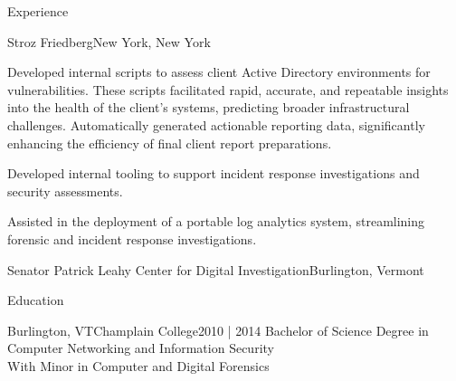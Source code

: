 \documentclass[]{mcdowellcv}
\begin{document}
\begin{cvsection}{Experience}
\begin{jobentry}{Stroz Friedberg}{New York, New York}
        \begin{jobprojects}
            \item Developed internal scripts to assess client Active Directory environments for vulnerabilities. These scripts facilitated rapid, accurate, and repeatable insights into the health of the client's systems, predicting broader infrastructural challenges. Automatically generated actionable reporting data, significantly enhancing the efficiency of final client report preparations.
            \item Developed internal tooling to support incident response investigations and security assessments.
            \item Assisted in the deployment of a portable log analytics system, streamlining forensic and incident response investigations.
        \end{jobprojects}
    \end{jobentry}


    \begin{jobentry}{Senator Patrick Leahy Center for Digital Investigation}{Burlington, Vermont}
        \begin{jobpositions}
        \end{jobpositions}
        
        
    \end{jobentry}

\end{cvsection}

\begin{cvsection}{Education}
    \begin{cvsubsection}{Burlington, VT}{Champlain College}{2010 | 2014}
        \vspace{-1em}Bachelor of Science Degree in Computer Networking and Information Security\\
        \hspace*{1em}With Minor in Computer and Digital Forensics
    \end{cvsubsection}
\end{cvsection}
\end{document}
